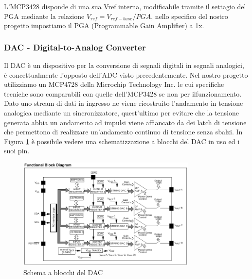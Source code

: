 \documentclass[10pt]{article}
\begin{document}
		L'MCP3428 disponde di una sua Vref interna, modificabile tramite il settagio del PGA mediante la relazione $V_{ref}=V_{ref-base}/PGA$, nello specifico del nostro progetto impostiamo il PGA (Programmable Gain Amplifier) a 1x.
		
		
		\subsubsection{DAC - Digital-to-Analog Converter}\label{sec:dac}
		Il DAC è un dispositivo per la conversione di segnali digitali in segnali analogici, è concettualmente l'opposto dell'ADC visto precedentemente.
		Nel nostro progetto utilizziamo un MCP4728 della Microchip Technology Inc. le cui specifiche tecniche sono comparabili con quelle dell'MCP3428 se non per ilfunzionamento. Dato uno stream di dati in ingresso ne viene ricostruito l'andamento in tensione analogica  mediante un sincronizzatore, quest'ultimo per evitare che la tensione generata abbia un andamento ad impulsi viene affiancato da dei latch di tensione che permettono di realizzare un'andamento continuo di tensione senza sbalzi.
		In Figura \ref{fig:dac} è possibile vedere una schematizzazione a blocchi del DAC in uso ed i suoi pin.
		\begin{figure}[h]
			\centering
			\includegraphics[width=0.8\textwidth]{src/dac_block}
			\caption{Schema a blocchi del DAC}\label{fig:dac}
		\end{figure}
\end{document}
